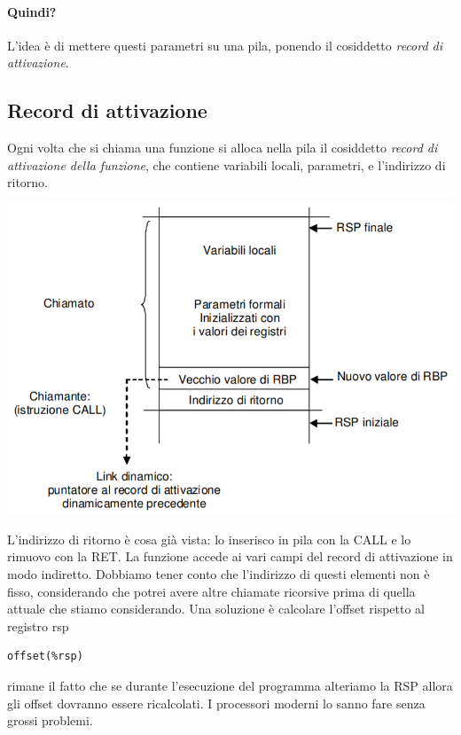 \documentclass[11pt]{report}
\theoremstyle{definition}
\begin{document}
\paragraph{Quindi?} L'idea è di mettere questi parametri su una pila, ponendo il cosiddetto \emph{record di attivazione}.
\clearpage 
\subsection{Record di attivazione}
Ogni volta che si chiama una funzione si alloca nella pila il cosiddetto \emph{record di attivazione della funzione}, che contiene variabili locali, parametri, e l'indirizzo di ritorno.
\begin{center}
\includegraphics[scale=0.59]{img/20.PNG}
\end{center} 
L'indirizzo di ritorno è cosa già vista: lo inserisco in pila con la CALL e lo rimuovo con la RET. La funzione accede ai vari campi del record di attivazione in modo indiretto. Dobbiamo tener conto che l'indirizzo di questi elementi non è fisso, considerando che potrei avere altre chiamate ricorsive prima di quella attuale che stiamo considerando. Una soluzione è calcolare l'offset rispetto al registro rsp
\begin{verbatim}
offset(%rsp)
\end{verbatim}
rimane il fatto che se durante l'esecuzione del programma alteriamo la RSP allora gli offset dovranno essere ricalcolati. I processori moderni lo sanno fare senza grossi problemi.
\end{document}
